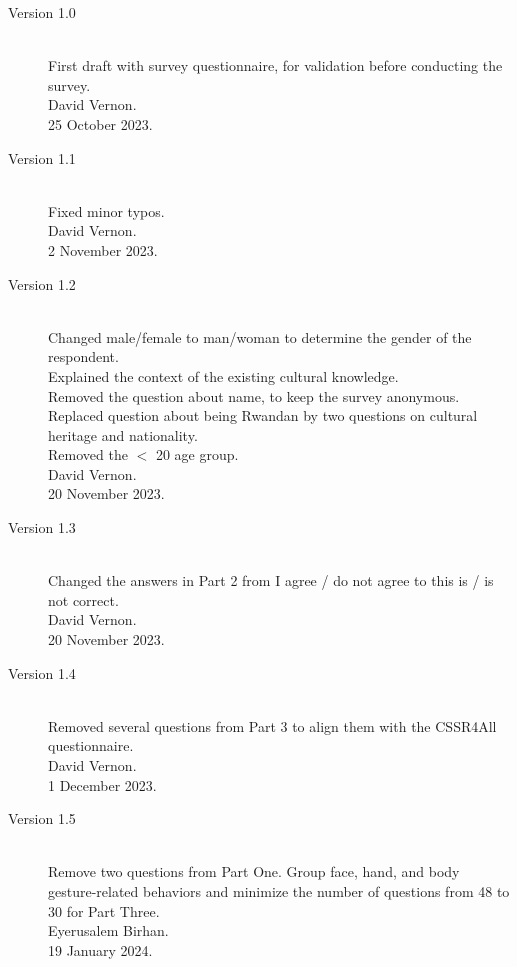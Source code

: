 \documentclass{CSSRforAfrica}
\begin{document}
\begin{description}

\item [Version 1.0]~\\
First draft with survey questionnaire, for validation before conducting the survey. \\
David  Vernon. \\                       
25 October 2023.                                               


\item [Version 1.1]~\\
Fixed minor typos. \\
David  Vernon. \\                       
2 November 2023.      

\item [Version 1.2]~\\
Changed male/female to man/woman to determine the gender of the respondent. \\
Explained the context of the existing cultural knowledge.\\
Removed the question about name, to keep the survey anonymous.\\
Replaced question about being Rwandan by two questions on cultural heritage and nationality.\\
Removed the $<$ 20 age group.\\
David  Vernon. \\                       
20 November 2023.   

\item [Version 1.3]~\\
Changed the answers in Part 2 from I agree / do not agree to this is / is not correct.\\
David  Vernon. \\                       
20 November 2023.   

\item [Version 1.4]~\\
Removed several questions from Part 3 to align them with the CSSR4All questionnaire.\\
David  Vernon. \\                       
1 December 2023.   

\item [Version 1.5]~\\
Remove two questions from Part One. Group face, hand, and body gesture-related behaviors and minimize the number of questions from 48 to 30 for Part Three.\\
Eyerusalem Birhan. \\                       
19 January 2024.   


\end{description}
\end{document}

